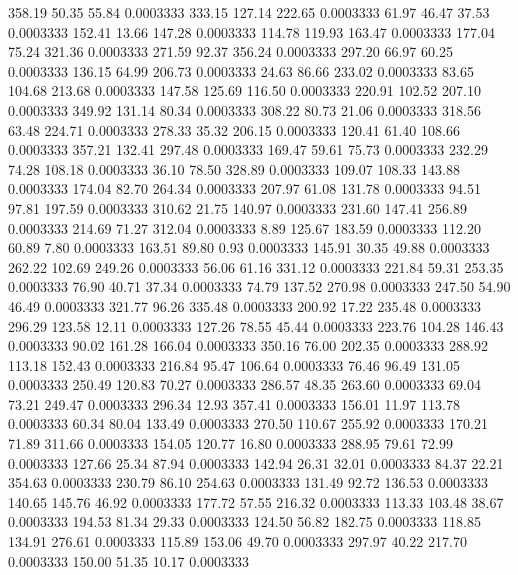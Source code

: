  358.19   50.35   55.84   0.0003333
 333.15  127.14  222.65   0.0003333
  61.97   46.47   37.53   0.0003333
 152.41   13.66  147.28   0.0003333
 114.78  119.93  163.47   0.0003333
 177.04   75.24  321.36   0.0003333
 271.59   92.37  356.24   0.0003333
 297.20   66.97   60.25   0.0003333
 136.15   64.99  206.73   0.0003333
  24.63   86.66  233.02   0.0003333
  83.65  104.68  213.68   0.0003333
 147.58  125.69  116.50   0.0003333
 220.91  102.52  207.10   0.0003333
 349.92  131.14   80.34   0.0003333
 308.22   80.73   21.06   0.0003333
 318.56   63.48  224.71   0.0003333
 278.33   35.32  206.15   0.0003333
 120.41   61.40  108.66   0.0003333
 357.21  132.41  297.48   0.0003333
 169.47   59.61   75.73   0.0003333
 232.29   74.28  108.18   0.0003333
  36.10   78.50  328.89   0.0003333
 109.07  108.33  143.88   0.0003333
 174.04   82.70  264.34   0.0003333
 207.97   61.08  131.78   0.0003333
  94.51   97.81  197.59   0.0003333
 310.62   21.75  140.97   0.0003333
 231.60  147.41  256.89   0.0003333
 214.69   71.27  312.04   0.0003333
   8.89  125.67  183.59   0.0003333
 112.20   60.89    7.80   0.0003333
 163.51   89.80    0.93   0.0003333
 145.91   30.35   49.88   0.0003333
 262.22  102.69  249.26   0.0003333
  56.06   61.16  331.12   0.0003333
 221.84   59.31  253.35   0.0003333
  76.90   40.71   37.34   0.0003333
  74.79  137.52  270.98   0.0003333
 247.50   54.90   46.49   0.0003333
 321.77   96.26  335.48   0.0003333
 200.92   17.22  235.48   0.0003333
 296.29  123.58   12.11   0.0003333
 127.26   78.55   45.44   0.0003333
 223.76  104.28  146.43   0.0003333
  90.02  161.28  166.04   0.0003333
 350.16   76.00  202.35   0.0003333
 288.92  113.18  152.43   0.0003333
 216.84   95.47  106.64   0.0003333
  76.46   96.49  131.05   0.0003333
 250.49  120.83   70.27   0.0003333
 286.57   48.35  263.60   0.0003333
  69.04   73.21  249.47   0.0003333
 296.34   12.93  357.41   0.0003333
 156.01   11.97  113.78   0.0003333
  60.34   80.04  133.49   0.0003333
 270.50  110.67  255.92   0.0003333
 170.21   71.89  311.66   0.0003333
 154.05  120.77   16.80   0.0003333
 288.95   79.61   72.99   0.0003333
 127.66   25.34   87.94   0.0003333
 142.94   26.31   32.01   0.0003333
  84.37   22.21  354.63   0.0003333
 230.79   86.10  254.63   0.0003333
 131.49   92.72  136.53   0.0003333
 140.65  145.76   46.92   0.0003333
 177.72   57.55  216.32   0.0003333
 113.33  103.48   38.67   0.0003333
 194.53   81.34   29.33   0.0003333
 124.50   56.82  182.75   0.0003333
 118.85  134.91  276.61   0.0003333
 115.89  153.06   49.70   0.0003333
 297.97   40.22  217.70   0.0003333
 150.00   51.35   10.17   0.0003333

